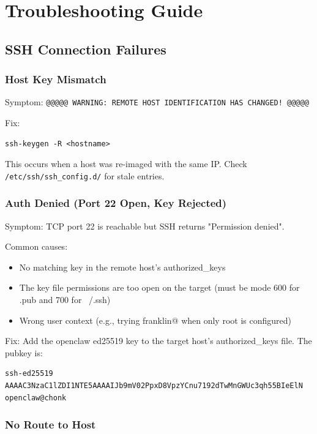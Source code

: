 \section{Troubleshooting Guide}

\subsection{SSH Connection Failures}

\subsubsection{Host Key Mismatch}

Symptom: \texttt{@@@@@ WARNING: REMOTE HOST IDENTIFICATION HAS CHANGED! @@@@@}

Fix:
\begin{lstlisting}[style=mystyle]
ssh-keygen -R <hostname>
    \end{lstlisting}

This occurs when a host was re-imaged with the same IP. Check \texttt{/etc/ssh/ssh\_config.d/} for stale entries.

\subsubsection{Auth Denied (Port 22 Open, Key Rejected)}

Symptom: TCP port 22 is reachable but SSH returns "Permission denied".

Common causes:
\begin{itemize}
    \item No matching key in the remote host's authorized\_keys
    
    \item The key file permissions are too open on the target (must be mode 600 for .pub and 700 for ~/.ssh)
    
    \item Wrong user context (e.g., trying franklin@ when only root is configured)
\end{itemize}

Fix: Add the openclaw ed25519 key to the target host's authorized\_keys file. The pubkey is:
\begin{lstlisting}[style=mystyle]
ssh-ed25519 AAAAC3NzaC1lZDI1NTE5AAAAIJb9mV02PpxD8VpzYCnu7192dTwMnGWUc3qh55BIeElN openclaw@chonk
    \end{lstlisting}

\subsubsection{No Route to Host}

